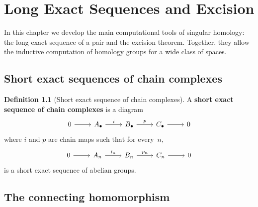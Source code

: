 \documentclass[12pt,a4paper,openany]{book}
\theoremstyle{definition}
\newtheorem{definition}{Definition}[chapter]
\theoremstyle{plain}
\theoremstyle{remark}
\begin{document}

\chapter{Long Exact Sequences and Excision}\label{ch:les-excision}

In this chapter we develop the main computational tools of singular
homology: the long exact sequence of a pair and the excision theorem.
Together, they allow the inductive computation of homology groups for a
wide class of spaces.

\section{Short exact sequences of chain complexes}\label{sec:ses-chain}

\begin{definition}[Short exact sequence of chain complexes]\label{def:ses-chain-complexes}
A \textbf{short exact sequence of chain complexes} is a diagram
\[
\begin{tikzcd}
  0 \ar[r]
  & A_\bullet \ar[r,"i"]
  & B_\bullet \ar[r,"p"]
  & C_\bullet \ar[r]
  & 0
\end{tikzcd}
\]
where $i$ and $p$ are chain maps such that for every~$n$,
\[
\begin{tikzcd}
  0 \ar[r]
  & A_n \ar[r,"i_n"]
  & B_n \ar[r,"p_n"]
  & C_n \ar[r]
  & 0
\end{tikzcd}
\]
is a short exact sequence of abelian groups.
\end{definition}

\section{The connecting homomorphism}\label{sec:connecting-hom}
\end{document}

